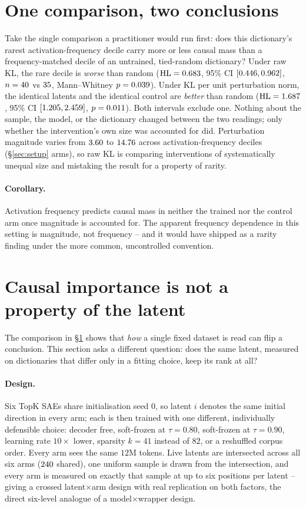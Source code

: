 \documentclass[11pt]{article}
\begin{document}
\section{One comparison, two conclusions}
\label{sec:flip}
Take the single comparison a practitioner would run first: does this dictionary's
rarest activation-frequency decile carry more or less causal mass than a
frequency-matched decile of an untrained, tied-random dictionary? Under raw KL,
the rare decile is \emph{worse} than random ($\mathrm{HL}=0.683$, 95\% CI
$[0.446,0.962]$, $n=40$ vs $35$,
Mann--Whitney $p=0.039$). Under KL per unit perturbation norm, the identical
latents and the identical control are \emph{better} than random
($\mathrm{HL}=1.687$, 95\% CI $[1.205,2.459]$,
$p=0.011$). Both intervals exclude one. Nothing about the sample, the model,
or the dictionary changed between the two readings; only whether the
intervention's own size was accounted for did. Perturbation magnitude varies
from $3.60$ to $14.76$ across activation-frequency deciles
(\S\ref{sec:setup} arms), so raw KL is comparing interventions of systematically
unequal size and mistaking the result for a property of rarity.

\paragraph{Corollary.} Activation frequency predicts causal mass in neither the
trained nor the control arm once magnitude is accounted for. The apparent
frequency dependence in this setting is magnitude, not frequency -- and it
would have shipped as a rarity finding under the more common, uncontrolled
convention.

\section{Causal importance is not a property of the latent}
\label{sec:property}
The comparison in \S\ref{sec:flip} shows that \emph{how} a single fixed dataset
is read can flip a conclusion. This section asks a different question: does the
same latent, measured on dictionaries that differ only in a fitting choice,
keep its rank at all?

\paragraph{Design.} Six TopK SAEs share initialisation seed $0$, so latent $i$
denotes the same initial direction in every arm; each is then trained with one
different, individually defensible choice: decoder free, soft-frozen at
$\tau=0.80$, soft-frozen at $\tau=0.90$, learning rate $10\times$ lower, sparsity
$k=41$ instead of $82$, or a reshuffled corpus order. Every arm sees the same
$12$M tokens. Live latents are intersected across all six arms
($240$ shared), one uniform sample is drawn from the intersection,
and every arm is measured on exactly that sample at up to six positions per
latent -- giving a crossed latent$\times$arm design with real replication on
both factors, the direct six-level analogue of a model$\times$wrapper design.
\end{document}
